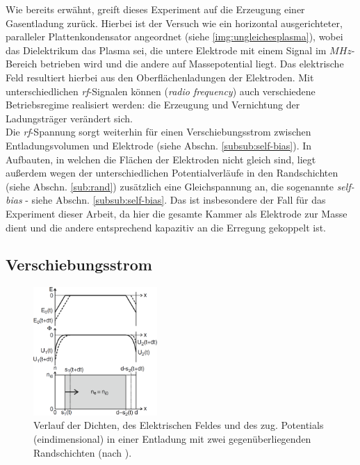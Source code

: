 \documentclass[numbers=noenddot,a4paper,notitlepage,twoside,BCOR15mm]{scrbook}
\newcommand{\tilt}[1]{\textit{#1}}
\begin{document}
			Wie bereits erwähnt, greift dieses Experiment auf die Erzeugung einer Gasentladung zurück. Hierbei ist der Versuch wie ein horizontal ausgerichteter, paralleler Plattenkondensator angeordnet (siehe \ref{img:ungleichesplasma}), wobei das Dielektrikum das Plasma sei, die untere Elektrode mit einem Signal im $\unit{MHz}$-Bereich betrieben wird und die andere auf Massepotential liegt. Das elektrische Feld resultiert hierbei aus den Oberflächenladungen der Elektroden. Mit unterschiedlichen \tilt{rf}-Signalen können (\tilt{radio frequency}) auch verschiedene Betriebsregime realisiert werden: die Erzeugung und Vernichtung der Ladungsträger verändert sich.\\
			Die \tilt{rf}-Spannung sorgt weiterhin für einen Verschiebungsstrom zwischen Entladungsvolumen und Elektrode (siehe Abschn. \ref{subsub:self-bias}). In Aufbauten, in welchen die Flächen der Elektroden nicht gleich sind, liegt außerdem wegen der unterschiedlichen Potentialverläufe in den Randschichten (siehe Abschn. \ref{sub:rand}) zusätzlich eine Gleichspannung an, die sogenannte \tilt{self-bias} - siehe Abschn. \ref{subsub:self-bias}. Das ist insbesondere der Fall für das Experiment dieser Arbeit, da hier die gesamte Kammer als Elektrode zur Masse dient und die andere entsprechend kapazitiv an die Erregung gekoppelt ist.

				\subsection{Verschiebungsstrom} \label{subsub:verschieb}

					\begin{figure}
						\centering
						\includegraphics[width=0.42\textwidth,height=0.55\textwidth]{figs/verschiebpiel.png}
						\caption{Verlauf der Dichten, des Elektrischen Feldes und des zug. Potentials (eindimensional) in einer Entladung mit zwei gegenüberliegenden Randschichten (nach \cite{Piel10}).}
						\label{img:verschieb}
					\end{figure}
\end{document}
